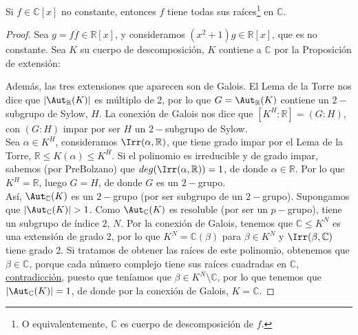 \begin{teo}
    Si $f\in \mathbb{C}[x]$ no constante, entonces $f$ tiene todas sus raíces\footnote{O equivalentemente, $\mathbb{C}$ es cuerpo de descomposición de $f$.} en $\mathbb{C}$.
    \begin{proof}
        Sea $g=f\overline{f}\in \mathbb{R}[x]$, y consideramos $(x^2+1)g\in \mathbb{R}[x]$, que es no constante. Sea $K$ su cuerpo de descomposición, $K$ contiene a $\mathbb{C}$ por la Proposición de extensión:
        \begin{figure}[H]
            \centering
        \end{figure}
        \noindent
        Además, las tres extensiones que aparecen son de Galois. El Lema de la Torre nos dice que $|\Aut_\mathbb{R}(K)|$ es múltiplo de 2, por lo que $G=\Aut_\mathbb{R}(K)$ contiene un $2-$subgrupo de Sylow, $H$. La conexión de Galois nos dice que $[K^H:\mathbb{R}] = (G:H)$, con $(G:H)$ impar por ser $H$ un $2-$subgrupo de Sylow.\\

        \noindent
        Sea $\alpha\in K^H$, consideramos $\Irr(\alpha,\mathbb{R})$, que tiene grado impar por el Lema de la Torre, $\mathbb{R}\leq K(\alpha)\leq K^H$. Si el polinomio es irreducible y de grado impar, sabemos (por PreBolzano) que $deg(\Irr(\alpha,\mathbb{R})) = 1$, de donde $\alpha\in \mathbb{R}$. Por lo que $K^H = \mathbb{R}$, luego $G=H$, de donde $G$ es un $2-$grupo.\\

        \noindent
        Así, $\Aut_\mathbb{C}(K)$ es un $2-$grupo (por ser subgrupo de un $2-$grupo). Supongamos que $|\Aut_\mathbb{C}(K)|>1$. Como $\Aut_\mathbb{C}(K)$ es resoluble (por ser un $p-$grupo), tiene un subgrupo de índice $2$, $N$. Por la conexión de Galois, tenemos que $\mathbb{C}\leq K^N$ es una extensión de grado 2, por lo que $K^N = \mathbb{C}(\beta)$ para $\beta\in K^N$ y $\Irr(\beta,\mathbb{C})$ tiene grado 2. Si tratamos de obtener las raíces de este polinomio, obtenemos que $\beta\in \mathbb{C}$, porque cada número complejo tiene sus raíces cuadradas en $\mathbb{C}$, \underline{contradicción}, puesto que teníamos que $\beta\in K^N\setminus \mathbb{C}$, por lo que tenemos que $|\Aut_\mathbb{C}(K)| = 1$, de donde por la conexión de Galois, $K = \mathbb{C}$.
    \end{proof}
\end{teo}

